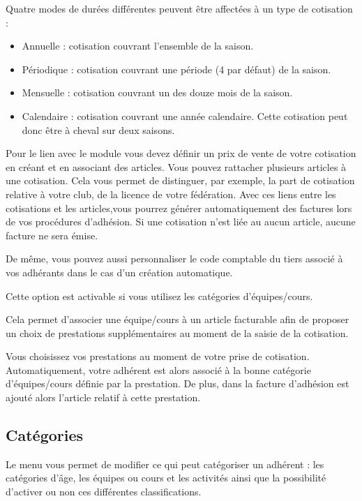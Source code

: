 \documentclass[a4paper,10pt,oneside,french]{sphinxmanual}
\begin{document}
\sphinxAtStartPar
Quatre modes de durées différentes peuvent être affectées à un type de cotisation :
\begin{itemize}
\item {} 
\sphinxAtStartPar
Annuelle : cotisation couvrant l’ensemble de la saison.

\item {} 
\sphinxAtStartPar
Périodique : cotisation couvrant une période (4 par défaut) de la saison.

\item {} 
\sphinxAtStartPar
Mensuelle : cotisation couvrant un des douze mois de la saison.

\item {} 
\sphinxAtStartPar
Calendaire : cotisation couvrant une année calendaire. Cette cotisation peut donc être à cheval sur deux saisons.

\end{itemize}

\sphinxAtStartPar
Pour le lien avec le module  vous devez définir un prix de vente de votre cotisation en créant et en associant des articles.
Vous pouvez rattacher plusieurs articles à  une cotisation. Cela vous permet de distinguer, par exemple, la part de cotisation relative à votre club, de la licence de votre fédération.
Avec ces liens entre les cotisations et les articles,vous pourrez générer automatiquement des factures lors de vos procédures d’adhésion. Si une cotisation n’est liée au aucun article, aucune facture ne sera émise.

\sphinxAtStartPar
De même, vous pouvez aussi personnaliser le code comptable du tiers associé à vos adhérants dans le cas d’un création automatique.

\sphinxAtStartPar
{}

\sphinxAtStartPar
Cette option est activable si vous utilisez les catégories d’équipes/cours.

\sphinxAtStartPar
Cela permet d’associer une équipe/cours à un article facturable afin de proposer un choix de prestations supplémentaires au moment de la saisie de la cotisation.

\sphinxAtStartPar
Vous choisissez vos prestations au moment de votre prise de cotisation.
Automatiquement, votre adhérent est alors associé à la bonne catégorie d’équipes/cours définie par la prestation.
De plus, dans la facture d’adhésion est ajouté alors l’article relatif à cette prestation.


\subsection{Catégories}
\label{\detokenize{member/config:categories}}
\sphinxAtStartPar
Le menu  vous permet de modifier ce qui peut catégoriser un adhérent : les catégories d’âge, les équipes ou cours et les activités ainsi que la possibilité d’activer ou non ces différentes classifications.
\end{document}
